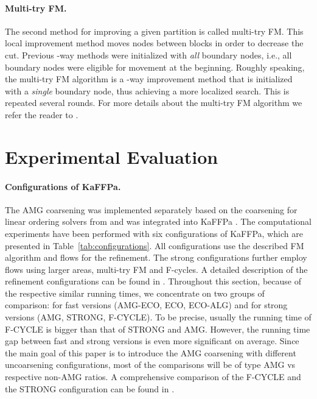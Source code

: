 \documentclass{llncs}
\begin{document}
\paragraph*{Multi-try FM.} 
The second method for improving a given partition is called multi-try FM. 
This local improvement method moves nodes between blocks in order to decrease the cut. 
Previous -way methods were initialized with \textit{all} boundary nodes, i.e., all boundary nodes were eligible for movement at the beginning.
Roughly speaking, the multi-try FM algorithm is a -way improvement method that is initialized with a \textit{single} boundary node, thus achieving a more localized search. This is repeated several rounds. 
For more details about the multi-try FM algorithm we refer the reader to \cite{kaffpa}. 

\section{Experimental Evaluation}
\label{sec:experiments}
\paragraph*{Configurations of KaFFPa.} 
The AMG coarsening was implemented separately based on the coarsening for linear ordering solvers from \cite{safro:relaxml} and was integrated into KaFFPa \cite{kaffpa}.
The computational experiments have been performed with six configurations of KaFFPa, which are presented in Table~\ref{tab:configurations}. 
All configurations use the described FM algorithm and flows for the refinement. The strong configurations further employ flows using larger areas, multi-try FM and F-cycles. A detailed description of the refinement configurations can be found in \cite{kaffpa}. Throughout this section, because of the respective similar running times, we concentrate on two groups of comparison: for fast versions (AMG-ECO, ECO, ECO-ALG) and for strong versions (AMG, STRONG, F-CYCLE). To be precise, usually
the running time of F-CYCLE is bigger than that of STRONG and AMG. However, the running time gap between fast and strong versions is even more significant on average. Since the main goal of this paper is to introduce the AMG coarsening with different uncoarsening configurations, most of the comparisons will be of type AMG vs respective non-AMG ratios. A comprehensive comparison of the F-CYCLE and the STRONG configuration can be found in \cite{kaffpa}. 
\end{document}
